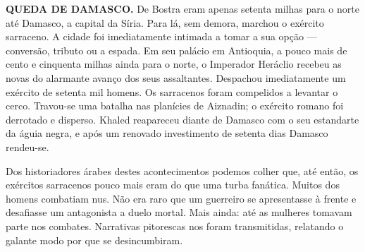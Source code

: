 \documentclass[11pt,a5paper,twoside,openany]{book}
\begin{document}
\textbf{QUEDA DE DAMASCO.} De Bostra eram apenas setenta milhas para o norte até Damasco, a capital da Síria. Para lá, sem demora, marchou o exército sarraceno. A cidade foi imediatamente intimada a tomar a sua opção — conversão, tributo ou a espada. Em seu palácio em Antioquia, a pouco mais de cento e cinquenta milhas ainda para o norte, o Imperador Heráclio recebeu as novas do alarmante avanço dos seus assaltantes. Despachou imediatamente um exército de setenta mil homens. Os sarracenos foram compelidos a levantar o cerco. Travou-se uma batalha nas planícies de Aiznadin; o exército romano foi derrotado e disperso. Khaled reapareceu diante de Damasco com o seu estandarte da águia negra, e após um renovado investimento de setenta dias Damasco rendeu-se.

Dos historiadores árabes destes acontecimentos podemos colher que, até então, os exércitos sarracenos pouco mais eram do que uma turba fanática. Muitos dos homens combatiam nus. Não era raro que um guerreiro se apresentasse à frente e desafiasse um antagonista a duelo mortal. Mais ainda: até as mulheres tomavam parte nos combates. Narrativas pitorescas nos foram transmitidas, relatando o galante modo por que se desincumbiram.
\end{document}
